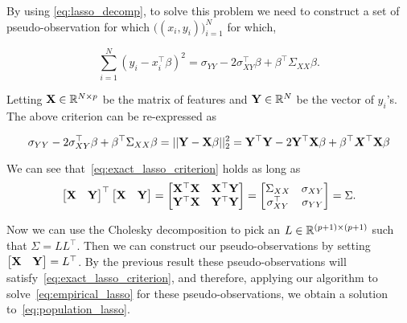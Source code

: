 \begin{enumerate}[label=(\alph*)]
 By using \eqref{eq:lasso_decomp}, to solve this problem we need to construct a set of pseudo-observation for which $\big((x_i,y_i)\big)_{i=1}^{N}$ for which, 
 
 $$\sum_{i=1}^N (y_i -x_i^\top \beta)^2 = \sigma_{YY}-2 \sigma_{XY}^\top \beta + \beta^ \top \Sigma_{XX} \beta.$$
 
 Letting $\bold X \in \mathbb{R}^{N \times p}$ be the matrix of features and $\bold Y \in \mathbb{R}^N$ be the vector of $y_i$'s. The above criterion can be re-expressed as
 
 \begin{equation}
 \label{eq:exact_lasso_criterion}
 \sigma_{YY}-2 \sigma_{XY}^\top \beta + \beta^ \top \Sigma_{XX} \beta= \vert \vert \bold Y - \bold X \beta \vert \vert_2^2= \bold Y^\top \bold Y - 2 \bold Y^\top \bold X \beta + \beta^\top \bm{X}^\top \bold X \beta
 \end{equation}
 
 
 
 We can see that~\eqref{eq:exact_lasso_criterion} holds as long as $$\begin{bmatrix}  \bold X & \bold Y \end{bmatrix}^\top \begin{bmatrix}  \bold X & \bold Y \end{bmatrix} =  \begin{bmatrix}  \bold X^ \top \bold X & \bold X^\top \bold Y \\ \bold Y^\top \bold X & \bold Y^\top \bold Y \end{bmatrix} = \begin{bmatrix}  \Sigma_{XX} & \sigma_{XY} \\ \sigma_{XY}^\top & \sigma_{YY} \end{bmatrix} = \Sigma.$$
 
 
 
 Now we can use the Cholesky decomposition to pick an $L \in {\mathbb R}^{(p+1)\times(p+1)}$ such that $\Sigma = LL^\top$. Then we can construct our pseudo-observations by setting $ \begin{bmatrix}  \bold X & \bold Y \end{bmatrix} =   L^\top$. By the previous result these pseudo-observations will satisfy~\eqref{eq:exact_lasso_criterion}, and therefore, applying our algorithm to solve~\eqref{eq:empirical_lasso} for these pseudo-observations, we obtain a solution to~\eqref{eq:population_lasso}.
 
 \end{enumerate}
